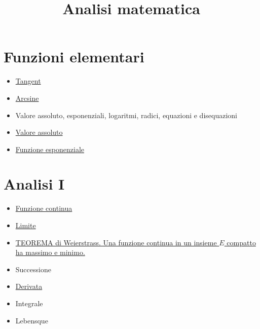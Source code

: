 \documentclass[a4paper,10pt]{article}
\title{Analisi matematica}
\author{}
\begin{document}
\maketitle
\section*{Funzioni elementari}
\begin{itemize}
 \item \href{Tangent.html}{Tangent}
 \item \href{Arcsine.html}{Arcsine}
 \item Valore assoluto, esponenziali, logaritmi, radici, equazioni e disequazioni
 \item \href{./ValoreAssoluto.html}{Valore assoluto}
 \item \href{./FunzioneEsponenziale.html}{Funzione esponenziale} 
\end{itemize}

\section{Analisi I}
\begin{itemize}
 \item \href{FunzioneContinua.html}{Funzione continua}
 \item \href{Limite.html}{Limite}
 \item \href{Weierstrass.html}{TEOREMA di Weierstrass. Una funzione continua in un insieme $E$ compatto ha massimo e minimo.}
 \item Successione
 \item \href{Derivata.html}{Derivata} 
 \item Integrale
 \item Lebensque
\end{itemize}
\end{document}
